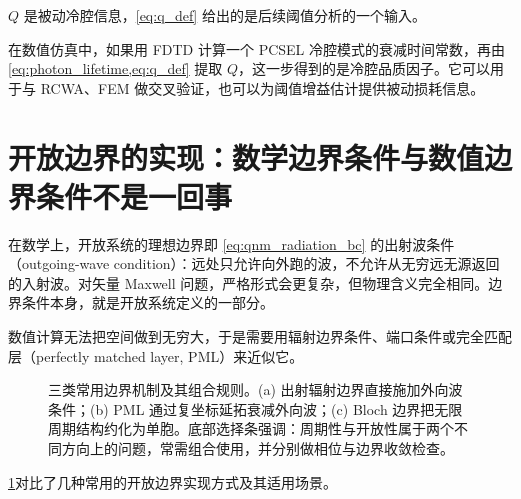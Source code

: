 $Q$ 是被动冷腔信息，\cref{eq:q_def} 给出的是后续阈值分析的一个输入。

\begin{ExampleBox}
在数值仿真中，如果用 FDTD 计算一个 PCSEL 冷腔模式的衰减时间常数，再由 \cref{eq:photon_lifetime,eq:q_def} 提取 $Q$，这一步得到的是冷腔品质因子。它可以用于与 RCWA、FEM 做交叉验证，也可以为阈值增益估计提供被动损耗信息。
\end{ExampleBox}

\section{开放边界的实现：数学边界条件与数值边界条件不是一回事}
在数学上，开放系统的理想边界即 \cref{eq:qnm_radiation_bc} 的出射波条件（outgoing-wave condition）：远处只允许向外跑的波，不允许从无穷远无源返回的入射波。对矢量 Maxwell 问题，严格形式会更复杂，但物理含义完全相同。边界条件本身，就是开放系统定义的一部分。

数值计算无法把空间做到无穷大，于是需要用辐射边界条件、端口条件或完全匹配层（perfectly matched layer, PML）来近似它。

\begin{figure}[htbp]
  \centering
  
  \caption{三类常用边界机制及其组合规则。(a) 出射辐射边界直接施加外向波条件；(b) PML 通过复坐标延拓衰减外向波；(c) Bloch 边界把无限周期结构约化为单胞。底部选择条强调：周期性与开放性属于两个不同方向上的问题，常需组合使用，并分别做相位与边界收敛检查。}
  \label{fig:ch03_boundary_conditions}
\end{figure}

\cref{fig:ch03_boundary_conditions}对比了几种常用的开放边界实现方式及其适用场景。

